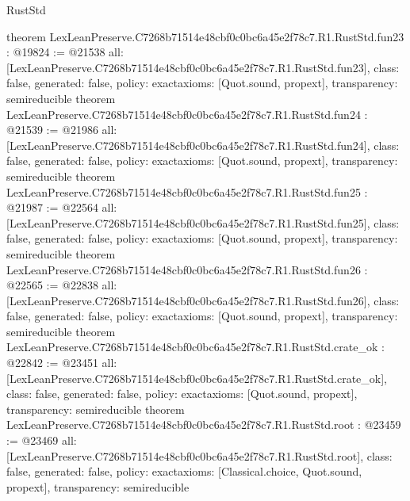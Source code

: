 \begin{lexlean}{RustStd}
\begin{coremodule}
{}
theorem LexLeanPreserve.C7268b71514e48cbf0c0bc6a45e2f78c7.R1.RustStd.fun23 : @19824 := @21538 {
  all: [LexLeanPreserve.C7268b71514e48cbf0c0bc6a45e2f78c7.R1.RustStd.fun23],
  class: false,
  generated: false,
  policy: exact{axioms: [Quot.sound, propext]},
  transparency: semireducible
}
theorem LexLeanPreserve.C7268b71514e48cbf0c0bc6a45e2f78c7.R1.RustStd.fun24 : @21539 := @21986 {
  all: [LexLeanPreserve.C7268b71514e48cbf0c0bc6a45e2f78c7.R1.RustStd.fun24],
  class: false,
  generated: false,
  policy: exact{axioms: [Quot.sound, propext]},
  transparency: semireducible
}
theorem LexLeanPreserve.C7268b71514e48cbf0c0bc6a45e2f78c7.R1.RustStd.fun25 : @21987 := @22564 {
  all: [LexLeanPreserve.C7268b71514e48cbf0c0bc6a45e2f78c7.R1.RustStd.fun25],
  class: false,
  generated: false,
  policy: exact{axioms: [Quot.sound, propext]},
  transparency: semireducible
}
theorem LexLeanPreserve.C7268b71514e48cbf0c0bc6a45e2f78c7.R1.RustStd.fun26 : @22565 := @22838 {
  all: [LexLeanPreserve.C7268b71514e48cbf0c0bc6a45e2f78c7.R1.RustStd.fun26],
  class: false,
  generated: false,
  policy: exact{axioms: [Quot.sound, propext]},
  transparency: semireducible
}
theorem LexLeanPreserve.C7268b71514e48cbf0c0bc6a45e2f78c7.R1.RustStd.crate_ok : @22842 := @23451 {
  all: [LexLeanPreserve.C7268b71514e48cbf0c0bc6a45e2f78c7.R1.RustStd.crate_ok],
  class: false,
  generated: false,
  policy: exact{axioms: [Quot.sound, propext]},
  transparency: semireducible
}
theorem LexLeanPreserve.C7268b71514e48cbf0c0bc6a45e2f78c7.R1.RustStd.root : @23459 := @23469 {
  all: [LexLeanPreserve.C7268b71514e48cbf0c0bc6a45e2f78c7.R1.RustStd.root],
  class: false,
  generated: false,
  policy: exact{axioms: [Classical.choice, Quot.sound, propext]},
  transparency: semireducible
}


\end{coremodule}
\end{lexlean}
